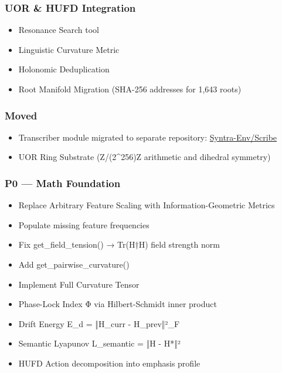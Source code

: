 \documentclass[12pt,a4paper]{article}
\providecommand{\tightlist}{\setlength{\itemsep}{0pt}\setlength{\parskip}{0pt}}
\begin{document}
\subsubsection{UOR \& HUFD Integration}\label{uor-hufd-integration}

\begin{itemize}
\tightlist
\item
  Resonance Search tool
\item
  Linguistic Curvature Metric
\item
  Holonomic Deduplication
\item
  Root Manifold Migration (SHA-256 addresses for 1,643 roots)
\end{itemize}

\subsubsection{Moved}\label{moved}

\begin{itemize}
\tightlist
\item
  Transcriber module migrated to separate repository:
  \href{https://github.com/Syntra-Env/Scribe}{Syntra-Env/Scribe}
\item
  UOR Ring Substrate (Z/(2\^{}256)Z arithmetic and dihedral symmetry)
\end{itemize}

\subsubsection{P0 --- Math Foundation}\label{p0-math-foundation}

\begin{itemize}
\tightlist
\item
  Replace Arbitrary Feature Scaling with Information-Geometric Metrics
\item
  Populate missing feature frequencies
\item
  Fix get\_field\_tension() → Tr(H†H) field strength norm
\item
  Add get\_pairwise\_curvature()
\item
  Implement Full Curvature Tensor
\item
  Phase-Lock Index Φ via Hilbert-Schmidt inner product
\item
  Drift Energy E\_d = ‖H\_curr - H\_prev‖²\_F
\item
  Semantic Lyapunov L\_semantic = ‖H - H*‖²
\item
  HUFD Action decomposition into emphasis profile
\end{itemize}
\end{document}
